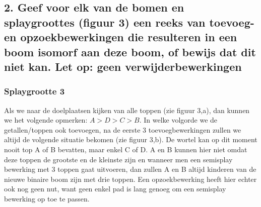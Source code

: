 \documentclass[dutch, 11pt]{report}
\begin{document}
\subsection*{2. Geef voor elk van de bomen en splaygroottes (figuur 3) een reeks van toevoeg- en opzoekbewerkingen die resulteren in een boom isomorf aan deze boom, of bewijs dat dit niet kan. Let op: geen verwijderbewerkingen}
\subsubsection*{Splaygrootte 3}
Als we naar de doelplaatsen kijken van alle toppen (zie figuur 3,a), dan kunnen we het volgende opmerken: $A > D > C > B$.
In welke volgorde we de getallen/toppen ook toevoegen, na de eerste 3 toevoegbewerkingen zullen we altijd de volgende situatie bekomen (zie figuur 3,b). De wortel kan op dit moment nooit top A of B bevatten, maar enkel C of D. A en B kunnen hier niet omdat deze toppen de grootste en de kleinste zijn en wanneer men een semisplay bewerking met 3 toppen gaat uitvoeren, dan zullen A en B altijd kinderen van de nieuwe binaire boom zijn met drie toppen. Een opzoekbewerking heeft hier echter ook nog geen nut, want geen enkel pad is lang genoeg om een semisplay bewerking op toe te passen. \newline

\begin{figure}%
    \centering
    \qquad
    \caption{}%
\end{figure}
\end{document}
